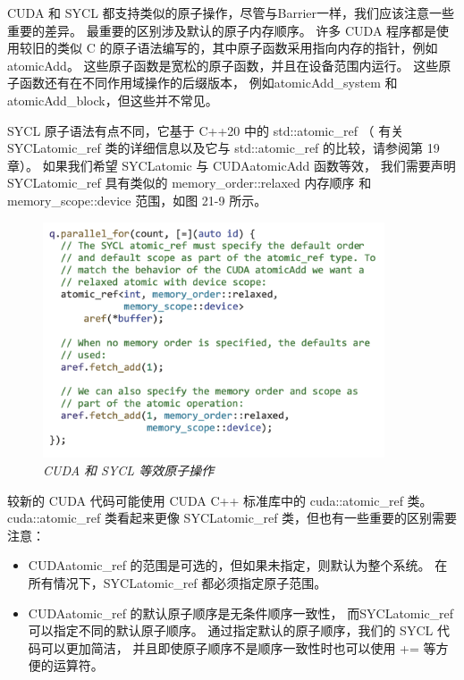 CUDA 和 SYCL 都支持类似的原子操作，尽管与Barrier一样，我们应该注意一些重要的差异。 
最重要的区别涉及默认的原子内存顺序。 
许多 CUDA 程序都是使用较旧的类似 C 的原子语法编写的，其中原子函数采用指向内存的指针，例如atomicAdd。 
这些原子函数是宽松的原子函数，并且在设备范围内运行。 
这些原子函数还有在不同作用域操作的后缀版本，
例如atomicAdd\_system 和atomicAdd\_block，但这些并不常见。

SYCL 原子语法有点不同，它基于 C++20 中的 std::atomic\_ref （
有关 SYCLatomic\_ref 类的详细信息以及它与 std::atomic\_ref 的比较，请参阅第 19 章）。 
如果我们希望 SYCLatomic 与 CUDAatomicAdd 函数等效，
我们需要声明 SYCLatomic\_ref 具有类似的 memory\_order::relaxed 内存顺序
和 memory\_scope::device 范围，如图 21-9 所示。

\begin{figure}[H]
	\centering
	\includegraphics[width=0.9\textwidth]{figs/F21.9.png}
	\caption{\textit{CUDA 和 SYCL 等效原子操作 }}
\end{figure}

较新的 CUDA 代码可能使用 CUDA C++ 标准库中的 cuda::atomic\_ref 类。 
cuda::atomic\_ref 类看起来更像 SYCLatomic\_ref 类，但也有一些重要的区别需要注意：

\begin{itemize}
	\item CUDAatomic\_ref 的范围是可选的，但如果未指定，则默认为整个系统。 
在所有情况下，SYCLatomic\_ref 都必须指定原子范围。

	\item CUDAatomic\_ref 的默认原子顺序是无条件顺序一致性，
而SYCLatomic\_ref 可以指定不同的默认原子顺序。 
通过指定默认的原子顺序，我们的 SYCL 代码可以更加简洁，
并且即使原子顺序不是顺序一致性时也可以使用 += 等方便的运算符。
\end{itemize}

